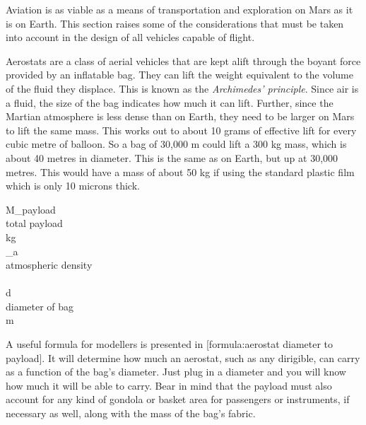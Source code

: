 

Aviation is as viable as a means of transportation and exploration on Mars as it is on Earth. This section raises some of the considerations that must be taken into account in the design of all vehicles capable of flight.

Aerostats are a class of aerial vehicles that are kept alift through the boyant force provided by an inflatable bag. They can lift the weight equivalent to the volume of the fluid they displace. This is known as the {\it Archimedes' principle}. Since air is a fluid, the size of the bag indicates how much it can lift. Further, since the Martian atmosphere is less dense than on Earth, they need to be larger on Mars to lift the same mass. This works out to about 10 grams of effective lift for every cubic metre of balloon. So a bag of 30,000 m could lift a 300 kg mass, which is about 40 metres in diameter. This is the same as on Earth, but up at 30,000 metres. This would have a mass of about 50 kg if using the standard plastic film which is only 10 microns thick.

\crlf
{}
\startformula
{}
\stopformula
\startlegend
\leg M_{payload} \\ total payload \\ kg \\
\leg {\rho}_a \\ atmospheric density \\  \\
\leg d \\ diameter of bag \\ m \\
\stoplegend
\crlf

A useful formula for modellers is presented in [formula:aerostat diameter to payload]. It will determine how much an aerostat, such as any dirigible, can carry as a function of the bag's diameter. Just plug in a diameter and you will know how much it will be able to carry. Bear in mind that the payload must also account for any kind of gondola or basket area for passengers or instruments, if necessary as well, along with the mass of the bag's fabric.

